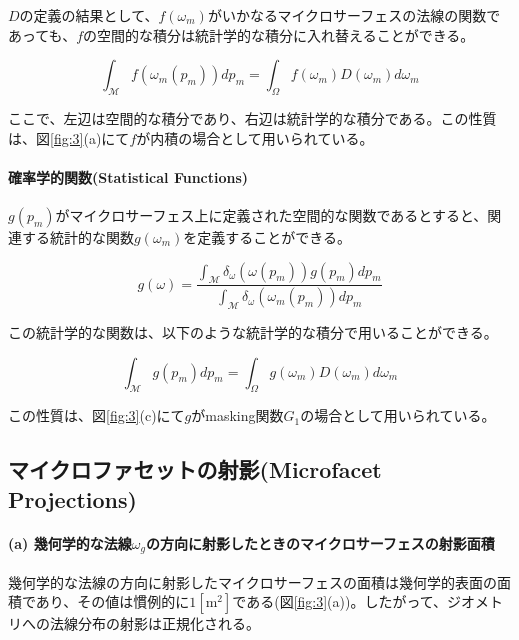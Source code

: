 \documentclass[a4j,xelatex,ja=standard]{bxjsarticle}
\begin{document}
$D$の定義の結果として、$f(\omega_m)$がいかなるマイクロサーフェスの法線の関数であっても、$f$の空間的な積分は統計学的な積分に入れ替えることができる。

\begin{equation}
    \int_{\mathcal M} f(\omega_m(p_m))dp_m = \int_{\Omega}f(\omega_m) D(\omega_m)d\omega_m
    \label{eq:6}
\end{equation}

ここで、左辺は空間的な積分であり、右辺は統計学的な積分である。この性質は、図\ref{fig:3}(a)にて$f$が内積の場合として用いられている。

\paragraph{確率学的関数(Statistical Functions)}

$g(p_m)$がマイクロサーフェス上に定義された空間的な関数であるとすると、関連する統計的な関数$g(\omega_m)$を定義することができる。

\begin{equation}
    g(\omega) = \frac{\int_{\mathcal M} \delta_{\omega}(\omega(p_m)) g(p_m) dp_m}{\int_{\mathcal M} \delta_{\omega}(\omega_m(p_m)) dp_m}
    \label{eq:7}
\end{equation}

この統計学的な関数は、以下のような統計学的な積分で用いることができる。

\begin{equation}
    \int_{\mathcal M} g(p_m)dp_m = \int_{\Omega}g(\omega_m) D(\omega_m)d\omega_m
    \label{eq:8}
\end{equation}

この性質は、図\ref{fig:3}(c)にて$g$がmasking関数$G_1$の場合として用いられている。

\subsection{マイクロファセットの射影(Microfacet Projections)}
\label{sec:2.3}

\paragraph{(a) 幾何学的な法線$\omega_g$の方向に射影したときのマイクロサーフェスの射影面積}

幾何学的な法線の方向に射影したマイクロサーフェスの面積は幾何学的表面の面積であり、その値は慣例的に$1 [\text{m}^2]$である(図\ref{fig:3}(a))。したがって、ジオメトリへの法線分布の射影は正規化される。
\end{document}
